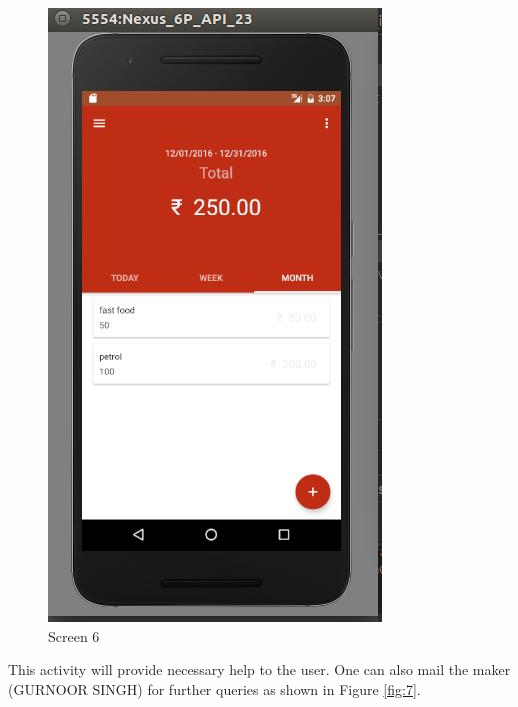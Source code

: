 \begin{figure}[ht]
\centering
\includegraphics[scale=0.38]{images/s61.png}
\caption{Screen 6}
\label{fig:6}
\end{figure}

\noindent This activity will provide necessary help to the user. One can also mail the maker
(GURNOOR SINGH) for further queries as shown in Figure \ref{fig:7}. 

